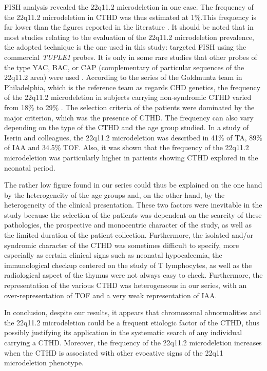 \begin{refsection}
FISH analysis revealed the 22q11.2 microdeletion in one case. The frequency of the 22q11.2 microdeletion in CTHD was thus estimated at 1\%.This frequency is far lower than the figures reported in the literature \cite{goldmuntz1993microdeletions, iserin1998prevalence}. It should be noted that in most studies relating to the evaluation of the 22q11.2 microdeletion prevalence, the adopted technique is the one used in this study: targeted FISH using the commercial \textit{TUPLE1} probes. It is only in some rare studies that other probes of the type YAC, BAC, or CAP (complementary of particular sequences of the 22q11.2 area) were used \cite{iserin1998prevalence}. According to the series of the Goldmuntz team in Philadelphia, which is the reference team as regards CHD genetics, the frequency of the 22q11.2 microdeletion in subjects carrying non-syndromic CTHD varied from 18\% to 29\% \cite{goldmuntz1993microdeletions}. The selection criteria of the patients were dominated by the major criterion, which was the presence of CTHD. 
The frequency can also vary depending on the type of the CTHD and the age group studied. In a study of Iserin and colleagues, \cite{iserin1998prevalence} the 22q11.2 microdeletion was described in 41\% of TA, 89\% of IAA and 34.5\% TOF. Also, it was shown that the frequency of the 22q11.2 microdeletion was particularly higher in patients showing CTHD explored in the neonatal period.

The rather low figure found in our series could thus be explained on the one hand by the heterogeneity of the age groups and, on the other hand, by the heterogeneity of the clinical presentation. These two factors were inevitable in the study because the selection of the patients was dependent on the scarcity of these pathologies, the prospective and monocentric character of the study, as well as the limited duration of the patient collection. Furthermore, the isolated and/or syndromic character of the CTHD was sometimes difficult to specify, more especially as certain clinical signs such as neonatal hypocalcemia, the immunological checkup centered on the study of T lymphocytes, as well as the radiological aspect of the thymus were not always easy to check. Furthermore, the representation of the various CTHD was heterogeneous in our series, with an over-representation of TOF and a very weak representation of IAA.

In conclusion, despite our results, it appears that chromosomal abnormalities and the 22q11.2 microdeletion could be a frequent etiologic factor of the CTHD, thus possibly justifying its application in the systematic search of any individual carrying a CTHD. Moreover, the frequency of the 22q11.2 microdeletion increases when the CTHD is associated with other evocative signs of the 22q11 microdeletion phenotype. 


\cleardoublepage
\printbibliography[heading=subbibintoc]
\end{refsection}
